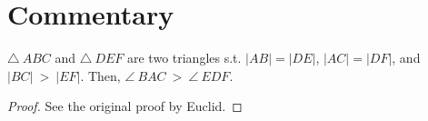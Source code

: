 \section*{Commentary}

\begin{proposition}\label{proposition_25}\leanok
    $\triangle~ABC$ and $\triangle~DEF$ are two triangles s.t. $|AB|=|DE|$, $|AC|=|DF|$, and $|BC|~>~|EF|$. Then, $\angle~BAC~>~\angle~EDF$.
\end{proposition}
\begin{proof}
    \leanok
    See the original proof by Euclid.
\end{proof}
